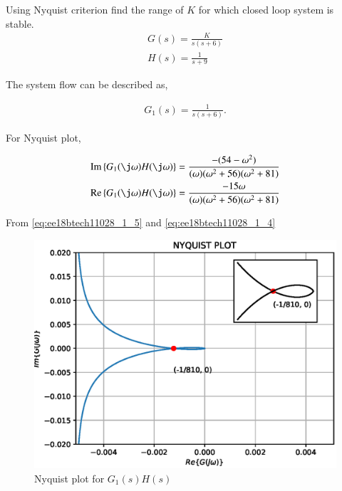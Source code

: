 \item Using Nyquist criterion find the range of $K$ for which closed loop system is stable.
\begin{align}
    G(s) = \frac{K}{s(s+6)}
    \label{eq:ee18btech11028_1_1}
\\
    H(s) = \frac{1}{s+9}
    \label{eq:ee18btech11028_1_2}
\end{align}

\solution
The system flow can be described as,

\begin{figure}[!ht]
    \begin{center}
        \resizebox{\columnwidth}{!}{}
    \end{center}
    \caption{}  
    \label{fig:ee18btech11028_1_fig1}
\end{figure}


\begin{align}
    G_{1}(s) = \frac{1}{s(s+6)}. 
    \label{eq:ee18btech11028_1_3}
\end{align}

For Nyquist plot, 

\begin{align}
    \text{Im} \cbrak{G_{1}(\j \omega)H(\j \omega)} &= \frac{-(54 - \omega^{2})}{(\omega)(\omega^{2}+56)(\omega^{2} + 81)}
    \label{eq:ee18btech11028_1_5}
\\
    \text{Re} \cbrak{G_{1}(\j \omega)H(\j \omega)} &= \frac{-15 \omega}{(\omega)(\omega^{2}+56)(\omega^{2} + 81)}
    \label{eq:ee18btech11028_1_4}
\end{align}

From \eqref{eq:ee18btech11028_1_5} and \eqref{eq:ee18btech11028_1_4}

\begin{figure}[!h]
\includegraphics[width=\columnwidth]{./figs/ee18btech11028_1.eps}
    \centering
  \caption{Nyquist plot for $G_{1}(s)H(s)$}
  \label{fig:ee18btech11028_1_fig2}
\end{figure}


